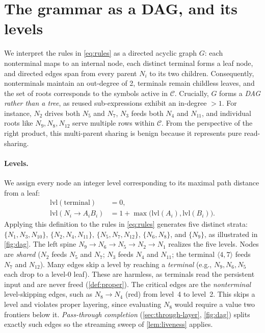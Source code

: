 \documentclass[twoside,leqno,twocolumn]{article}
\begin{document}
\section{The grammar as a DAG, and its levels}
\label{sec:dag}

We interpret the rules in \cref{eq:rules} as a directed acyclic graph $G$: each nonterminal maps to an internal node, each distinct terminal forms a leaf node, and directed edges span from every parent $N_i$ to its two children. Consequently, nonterminals maintain an out-degree of 2, terminals remain childless leaves, and the set of roots corresponds to the symbols active in $\mathcal{C}$. Crucially, $G$ forms a \emph{DAG rather than a tree}, as reused sub-expressions exhibit an in-degree $>1$. For instance, $N_2$ drives both $N_5$ and $N_7$, $N_3$ feeds both $N_4$ and $N_{11}$, and individual roots like $N_9,N_8,N_{12}$ serve multiple rows within $\mathcal{C}$. From the perspective of the right product, this multi-parent sharing is benign because it represents pure read-sharing.

\paragraph{Levels.} We assign every node an integer level corresponding to its maximal path distance from a leaf:
\begin{equation}
\label{eq:level}
\begin{aligned}
\mathrm{lvl}(\text{terminal})&=0,\\
\mathrm{lvl}(N_i\!\to\!A_iB_i)&=1+\max\bigl(\mathrm{lvl}(A_i),\mathrm{lvl}(B_i)\bigr).
\end{aligned}
\end{equation}
Applying this definition to the rules in \cref{eq:rules} generates five distinct strata: $\{N_1,N_3,N_{10}\}$, $\{N_2,N_4,N_{11}\}$, $\{N_5,N_7,N_{12}\}$, $\{N_6,N_8\}$, and $\{N_9\}$, as illustrated in \cref{fig:dag}. The left spine $N_9\!\to\!N_6\!\to\!N_5\!\to\!N_2\!\to\!N_1$ realizes the five levels. Nodes are \emph{shared} ($N_2$ feeds $N_5$ and $N_7$; $N_3$ feeds $N_4$ and $N_{11}$; the terminal $\langle4,7\rangle$ feeds $N_7$ and $N_{12}$). Many edges skip a level by reaching a \emph{terminal} (e.g., $N_9,N_6,N_5$ each drop to a level-0 leaf). These are harmless, as terminals read the persistent input and are never freed (\cref{def:proper}). The critical edges are the \emph{nonterminal} level-skipping edges, such as \textcolor{red!70!black}{$N_8\!\to\!N_4$} (red) from level~4 to level~2. This skips a level and violates proper layering, since evaluating $N_8$ would require a value two frontiers below it. \emph{Pass-through completion} (\cref{sec:through-layer}, \cref{fig:dag}) splits exactly such edges so the streaming sweep of \cref{lem:liveness} applies.
\end{document}
